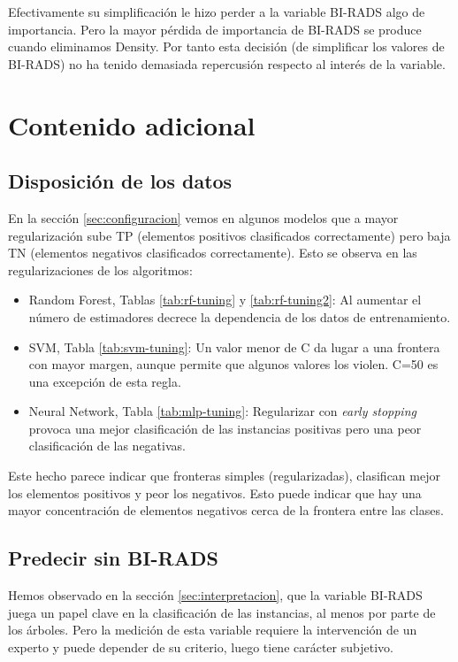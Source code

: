 \documentclass{article}
\begin{document}
Efectivamente su simplificación le hizo perder a la variable BI-RADS
algo de importancia. Pero la mayor pérdida de importancia de BI-RADS
se produce cuando eliminamos Density. Por tanto esta decisión (de
simplificar los valores de BI-RADS) no ha tenido demasiada repercusión
respecto al interés de la variable.

\section{Contenido adicional}

\subsection{Disposición de los datos}

En la sección \ref{sec:configuracion} vemos en algunos modelos que a
mayor regularización sube TP (elementos positivos clasificados
correctamente) pero baja TN (elementos negativos clasificados
correctamente). Esto se observa en las regularizaciones de los
algoritmos:

\begin{itemize}
\item Random Forest, Tablas \ref{tab:rf-tuning} y
  \ref{tab:rf-tuning2}: Al aumentar el número de estimadores decrece
  la dependencia de los datos de entrenamiento.
\item SVM, Tabla \ref{tab:svm-tuning}: Un valor menor de C da lugar a
  una frontera con mayor margen, aunque permite que algunos valores
  los violen. C=50 es una excepción de esta regla.
\item Neural Network, Tabla \ref{tab:mlp-tuning}: Regularizar con
  \emph{early stopping} provoca una mejor clasificación de las
  instancias positivas pero una peor clasificación de las negativas.
\end{itemize}

Este hecho parece indicar que fronteras simples (regularizadas),
clasifican mejor los elementos positivos y peor los negativos. Esto
puede indicar que hay una mayor concentración de elementos negativos
cerca de la frontera entre las clases.

\subsection{Predecir sin BI-RADS}

Hemos observado en la sección \ref{sec:interpretacion}, que la
variable BI-RADS juega un papel clave en la clasificación de las
instancias, al menos por parte de los árboles. Pero la medición de
esta variable requiere la intervención de un experto y puede depender
de su criterio, luego tiene carácter subjetivo.
\end{document}
